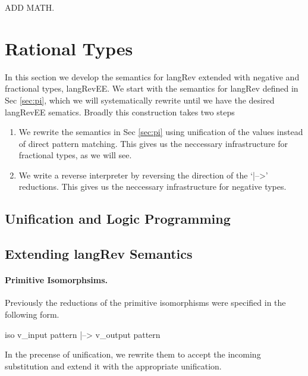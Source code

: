\documentclass[preprint]{sigplanconf}
\begin{document}
ADD MATH. 

\section{Rational Types}
\label{sec:rat}

In this section we develop the semantics for {{langRev}} extended with
negative and fractional types, {{langRevEE}}.  We start with the
semantics for {{langRev}} defined in Sec \ref{sec:pi}, which we will
systematically rewrite until we have the desired {{langRevEE}}
sematics. Broadly this construction takes two steps 

\begin{enumerate}
\item We rewrite the semantics in Sec \ref{sec:pi} using unification
  of the values instead of direct pattern matching. This gives us the
  neccessary infrastructure for fractional types, as we will see. 

\item We write a reverse interpreter by reversing the direction of the
  `{{|-->}}' reductions. This gives us the neccessary infrastructure for
  negative types.
\end{enumerate}


\subsection{Unification and Logic Programming}



\subsection{Extending {{langRev}} Semantics}


\paragraph{Primitive Isomorphsims.}
Previously the reductions of the primitive isomorphisms were specified
in the following form.

{{ iso v_{input pattern} |--> v_{output pattern} }}

\noindent
In the precense of unification, we rewrite them to accept the incoming
substitution and extend it with the appropriate unification.
\end{document}
